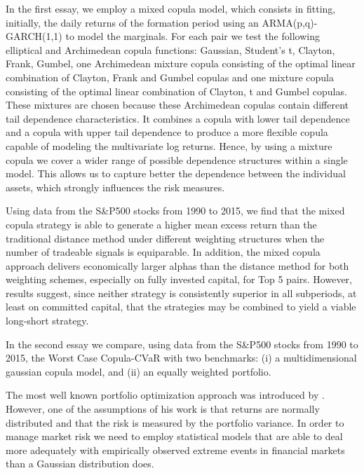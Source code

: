 \documentclass[a4paper,12pt]{report}
\begin{document}
\begin{refsection}
	In the first essay, we employ a mixed copula model, which consists in fitting, initially, the daily returns of the formation period using an ARMA(p,q)-GARCH(1,1) to model the marginals. For each pair we test the following elliptical and Archimedean copula functions: Gaussian, Student's t, Clayton, Frank, Gumbel, one Archimedean mixture copula consisting of the optimal linear combination of Clayton, Frank and Gumbel copulas and one mixture copula consisting of the optimal linear combination of Clayton, t and Gumbel copulas. These mixtures are chosen because these Archimedean copulas contain different tail dependence characteristics. It combines a copula with lower tail dependence and a copula with upper tail dependence to produce a more flexible copula capable of modeling the multivariate log returns. Hence, by using a mixture copula we cover a wider range of possible dependence structures within a single model. This allows us to capture better the dependence between the individual assets, which strongly influences the risk measures.
	
	Using data from the S\&P500 stocks from 1990 to 2015, we find that the mixed copula strategy is able to generate a higher mean excess return than the traditional distance method under different weighting structures when the number of tradeable signals is equiparable. In addition, the mixed copula approach delivers economically larger alphas than the distance method for both weighting schemes, especially on fully invested capital, for Top 5 pairs. However, results suggest, since neither strategy is consistently superior in all subperiods, at least on committed capital, that the strategies may be combined to yield a viable long-short strategy.
	
	In the second essay we compare, using data from the S\&P500 stocks from 1990 to 2015, the Worst Case Copula-CVaR with two benchmarks: (i) a multidimensional gaussian copula model, and (ii) an equally weighted portfolio. 
	
	The most well known portfolio optimization approach was introduced by \citet*{markowitz1952}. However, one of the assumptions of his work is that returns are normally distributed and that the risk is measured by the portfolio variance. In order to manage market risk we need to employ statistical models that are able to deal more adequately with empirically observed extreme events in financial markets than a Gaussian distribution does.
	

\end{refsection}
\end{document}
